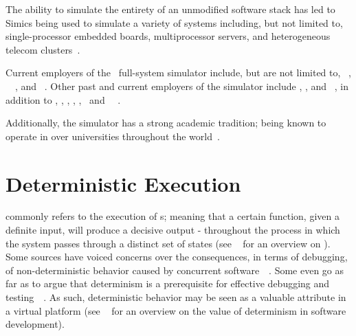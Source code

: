 \noindent
The ability to simulate the entirety of an unmodified software stack has led to Simics being used to simulate a variety of systems including, but not limited to, single-processor embedded boards, multiprocessor servers, and heterogeneous telecom clusters~.

Current employers of the \dvttermsimics\ full-system simulator include, but are not limited to, \dvttermibm ~, \dvttermnasa ~~, and \dvttermintel ~.
Other past and current employers of the simulator include \dvttermsunmicrosystems , \dvttermericsson , and \dvttermhewlettpackard ~, in addition to \dvttermcisco , \dvttermfreescalesemiconductor , \dvttermgeavionics , \dvttermhoneywell , \dvttermlockheedmartin , \dvttermnortel\ and \dvttermnorthropgrumman\ ~.

Additionally, the simulator has a strong academic tradition; being known to operate in over  universities throughout the world~.


\section{Deterministic Execution}
\label{sec:background_deterministicexecution}
 commonly refers to the execution of \dvttermdeterministicalgorithm s; meaning that a certain function, given a definite input, will produce a decisive output - throughout the process in which the system passes through a distinct set of states (see ~ for an overview on ).
Some sources have voiced concerns over the consequences, in terms of debugging, of non-deterministic behavior caused by concurrent software~~.
Some even go as far as to argue that determinism is a prerequisite for effective debugging and testing~~.
As such, deterministic behavior may be seen as a valuable attribute in a virtual platform (see ~ for an overview on the value of determinism in software development).

